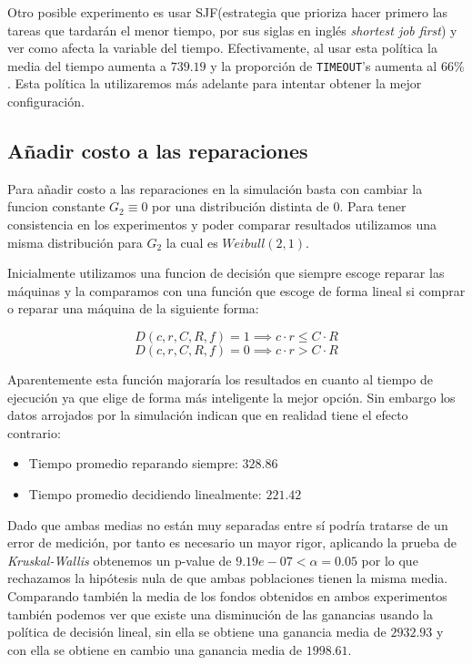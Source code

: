 \documentclass[10pt,twocolumn]{article}
\begin{document}
Otro posible experimento es usar SJF(estrategia que prioriza hacer primero las tareas que tardarán el menor tiempo, por sus siglas en inglés \textit{shortest job first}) y ver como afecta la variable del tiempo. Efectivamente, al usar esta política la media del tiempo aumenta a $739.19$ y la proporción de \texttt{TIMEOUT}'s aumenta al $66\%$. Esta política la utilizaremos más adelante para intentar obtener la mejor configuración.

\subsection{Añadir costo a las reparaciones}

Para añadir costo a las reparaciones en la simulación basta con cambiar la funcion constante $G_{2} \equiv 0$ por una distribución distinta de $0$. Para tener consistencia en los experimentos y poder comparar resultados utilizamos una misma distribución para $G_{2}$ la cual es $Weibull(2, 1)$.

Inicialmente utilizamos una funcion de decisión que siempre escoge reparar las máquinas y la comparamos con una función que escoge de forma lineal si comprar o reparar una máquina de la siguiente forma:

$$
    D(c, r, C, R, f) = 1 \implies c \cdot r \leq C \cdot R
$$
$$
    D(c, r, C, R, f) = 0 \implies c \cdot r > C \cdot R
$$

Aparentemente esta función majoraría los resultados en cuanto al tiempo de ejecución ya que elige de forma más inteligente la mejor opción. Sin embargo los datos arrojados por la simulación indican que en realidad tiene el efecto contrario:

\begin{itemize}
    \item Tiempo promedio reparando siempre: $328.86$
    \item Tiempo promedio decidiendo linealmente: $221.42$
\end{itemize}

Dado que ambas medias no están muy separadas entre sí podría tratarse de un error de medición, por tanto es necesario un mayor rigor, aplicando la prueba de \textit{Kruskal-Wallis} obtenemos un p-value de $9.19e-07 < \alpha = 0.05$ por lo que rechazamos la hipótesis nula de que ambas poblaciones tienen la misma media. Comparando también la media de los fondos obtenidos en ambos experimentos también podemos ver que existe una disminución de las ganancias usando la política de decisión lineal, sin ella se obtiene una ganancia media de $2932.93$ y con ella se obtiene en cambio una ganancia media de $1998.61$.
\end{document}
